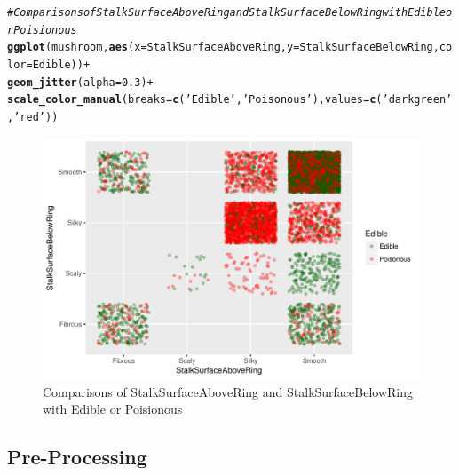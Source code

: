 \documentclass[10pt  ,usenames, dvipsnames]{article}\usepackage[]{graphicx}\usepackage[]{color}
\makeatletter
\newcommand{\hlnum}[1]{\textcolor[rgb]{0.686,0.059,0.569}{#1}}%
\newcommand{\hlstr}[1]{\textcolor[rgb]{0.192,0.494,0.8}{#1}}%
\newcommand{\hlcom}[1]{\textcolor[rgb]{0.678,0.584,0.686}{\textit{#1}}}%
\newcommand{\hlopt}[1]{\textcolor[rgb]{0,0,0}{#1}}%
\newcommand{\hlstd}[1]{\textcolor[rgb]{0.345,0.345,0.345}{#1}}%
\newcommand{\hlkwc}[1]{\textcolor[rgb]{0.333,0.667,0.333}{#1}}%
\newcommand{\hlkwd}[1]{\textcolor[rgb]{0.737,0.353,0.396}{\textbf{#1}}}%
\newenvironment{kframe}{%
 \def\at@end@of@kframe{}%
 \ifinner\ifhmode%
  \def\at@end@of@kframe{\end{minipage}}%
  \begin{minipage}{\columnwidth}%
 \fi\fi%
 \def\FrameCommand##1{\hskip\@totalleftmargin \hskip-\fboxsep
 \colorbox{shadecolor}{##1}\hskip-\fboxsep
     \hskip-\linewidth \hskip-\@totalleftmargin \hskip\columnwidth}%
 \MakeFramed {\advance\hsize-\width
   \@totalleftmargin\z@ \linewidth\hsize
   \@setminipage}}%
 {\par\unskip\endMakeFramed%
 \at@end@of@kframe}
\newenvironment{knitrout}{}{} %
\makeatother
\begin{document}
\clearpage

\begin{knitrout}
\color{fgcolor}\begin{kframe}
\begin{alltt}
\hlcom{#Comparisons of StalkSurfaceAboveRing and StalkSurfaceBelowRing with Edible or Poisionous}
\hlkwd{ggplot}\hlstd{(mushroom,}\hlkwd{aes}\hlstd{(}\hlkwc{x}\hlstd{=StalkSurfaceAboveRing,} \hlkwc{y}\hlstd{=StalkSurfaceBelowRing,} \hlkwc{color}\hlstd{=Edible))} \hlopt{+}
  \hlkwd{geom_jitter}\hlstd{(}\hlkwc{alpha}\hlstd{=}\hlnum{0.3}\hlstd{)} \hlopt{+}
  \hlkwd{scale_color_manual}\hlstd{(}\hlkwc{breaks} \hlstd{=} \hlkwd{c}\hlstd{(}\hlstr{'Edible'}\hlstd{,}\hlstr{'Poisonous'}\hlstd{),} \hlkwc{values}\hlstd{=}\hlkwd{c}\hlstd{(}\hlstr{'darkgreen'}\hlstd{,}\hlstr{'red'}\hlstd{))}
\end{alltt}
\end{kframe}
\end{knitrout}

\begin{figure}[H]
\begin{center}
\begin{knitrout}
\color{fgcolor}
\includegraphics[width=.76\linewidth]{figure/unnamed-chunk-20-1} 

\end{knitrout}
\caption {Comparisons of StalkSurfaceAboveRing and StalkSurfaceBelowRing with Edible or Poisionous}
\label{fig3}
\end {center}
\end {figure}



\clearpage

\subsection {Pre-Processing}
\end{document}
